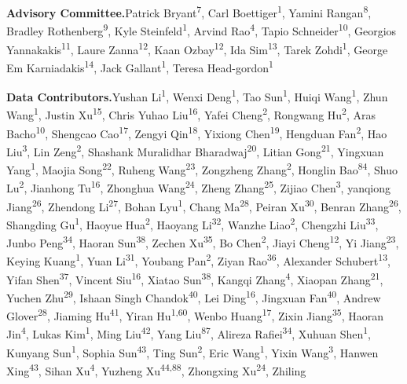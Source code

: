 \documentclass{llmxive}
\begin{document}
\noindent\textbf{Advisory Committee.}\quad Patrick Bryant\textsuperscript{7}, Carl Boettiger\textsuperscript{1}, Yamini Rangan\textsuperscript{8}, Bradley Rothenberg\textsuperscript{9}, Kyle Steinfeld\textsuperscript{1}, Arvind Rao\textsuperscript{4}, Tapio Schneider\textsuperscript{10}, Georgios Yannakakis\textsuperscript{11}, Laure Zanna\textsuperscript{12}, Kaan Ozbay\textsuperscript{12}, Ida Sim\textsuperscript{13}, Tarek Zohdi\textsuperscript{1}, George Em Karniadakis\textsuperscript{14}, Jack Gallant\textsuperscript{1}, Teresa Head-gordon\textsuperscript{1}\par
\vspace{4pt}

\noindent\textbf{Data Contributors.}\quad Yushan Li\textsuperscript{1}, Wenxi Deng\textsuperscript{1}, Tao Sun\textsuperscript{1}, Huiqi Wang\textsuperscript{1}, Zhun Wang\textsuperscript{1}, Justin Xu\textsuperscript{15}, Chris Yuhao Liu\textsuperscript{16}, Yafei Cheng\textsuperscript{2}, Rongwang Hu\textsuperscript{2}, Aras Bacho\textsuperscript{10}, Shengcao Cao\textsuperscript{17}, Zengyi Qin\textsuperscript{18}, Yixiong Chen\textsuperscript{19}, Hengduan Fan\textsuperscript{2}, Hao Liu\textsuperscript{3}, Lin Zeng\textsuperscript{2}, Shashank Muralidhar Bharadwaj\textsuperscript{20}, Litian Gong\textsuperscript{21}, Yingxuan Yang\textsuperscript{1}, Maojia Song\textsuperscript{22}, Ruheng Wang\textsuperscript{23}, Zongzheng Zhang\textsuperscript{2}, Honglin Bao\textsuperscript{84}, Shuo Lu\textsuperscript{2}, Jianhong Tu\textsuperscript{16}, Zhonghua Wang\textsuperscript{24}, Zheng Zhang\textsuperscript{25}, Zijiao Chen\textsuperscript{3}, yanqiong Jiang\textsuperscript{26}, Zhendong Li\textsuperscript{27}, Bohan Lyu\textsuperscript{1}, Chang Ma\textsuperscript{28}, Peiran Xu\textsuperscript{30}, Benran Zhang\textsuperscript{26}, Shangding Gu\textsuperscript{1}, Haoyue Hua\textsuperscript{2}, Haoyang Li\textsuperscript{32}, Wanzhe Liao\textsuperscript{2}, Chengzhi Liu\textsuperscript{33}, Junbo Peng\textsuperscript{34}, Haoran Sun\textsuperscript{38}, Zechen Xu\textsuperscript{35}, Bo Chen\textsuperscript{2}, Jiayi Cheng\textsuperscript{12}, Yi Jiang\textsuperscript{23}, Keying Kuang\textsuperscript{1}, Yuan Li\textsuperscript{31}, Youbang Pan\textsuperscript{2}, Ziyan Rao\textsuperscript{36}, Alexander Schubert\textsuperscript{13}, Yifan Shen\textsuperscript{37}, Vincent Siu\textsuperscript{16}, Xiatao Sun\textsuperscript{38}, Kangqi Zhang\textsuperscript{4}, Xiaopan Zhang\textsuperscript{21}, Yuchen Zhu\textsuperscript{29}, Ishaan Singh Chandok\textsuperscript{40}, Lei Ding\textsuperscript{16}, Jingxuan Fan\textsuperscript{40}, Andrew Glover\textsuperscript{28}, Jiaming Hu\textsuperscript{41}, Yiran Hu\textsuperscript{1,60}, Wenbo Huang\textsuperscript{17}, Zixin Jiang\textsuperscript{35}, Haoran Jin\textsuperscript{4}, Lukas Kim\textsuperscript{1}, Ming Liu\textsuperscript{42}, Yang Liu\textsuperscript{87}, Alireza Rafiei\textsuperscript{34}, Xuhuan Shen\textsuperscript{1}, Kunyang Sun\textsuperscript{1}, Sophia Sun\textsuperscript{43}, Ting Sun\textsuperscript{2}, Eric Wang\textsuperscript{1}, Yixin Wang\textsuperscript{3}, Hanwen Xing\textsuperscript{43}, Sihan Xu\textsuperscript{4}, Yuzheng Xu\textsuperscript{44,88}, Zhongxing Xu\textsuperscript{24}, Zhiling 
\end{document}
